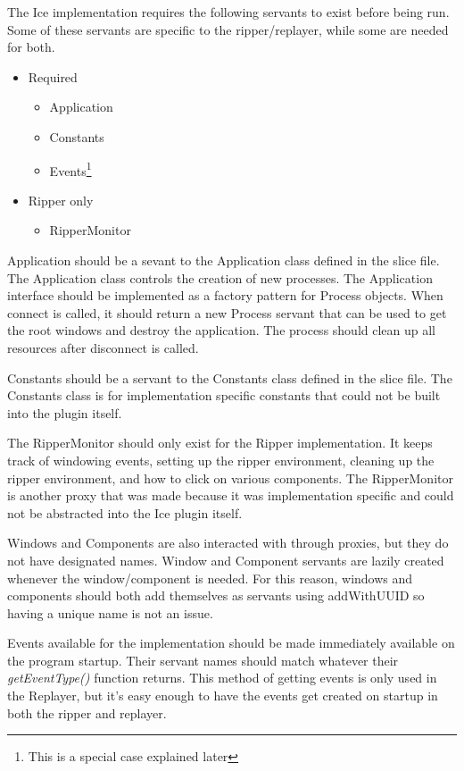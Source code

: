 The Ice implementation requires the following servants to exist before being run. Some of these servants are specific to the ripper/replayer, while some are needed for both.
\begin{itemize}
\item Required
  \begin{itemize}
  \item Application
  \item Constants
  \item Events\footnote{This is a special case explained later}
  \end{itemize}
\item Ripper only
  \begin{itemize}
  \item RipperMonitor
  \end{itemize}
\end{itemize}

Application should be a sevant to the Application class defined in the slice file. The Application class controls the creation of new processes. The Application interface should be implemented as a factory pattern for Process objects. When connect is called, it should return a new Process servant that can be used to get the root windows and destroy the application. The process should clean up all resources after disconnect is called.

Constants should be a servant to the Constants class defined in the slice file. The Constants class is for implementation specific constants that could not be built into the plugin itself.

The RipperMonitor should only exist for the Ripper implementation. It keeps track of windowing events, setting up the ripper environment, cleaning up the ripper environment, and how to click on various components. The RipperMonitor is another proxy that was made because it was implementation specific and could not be abstracted into the Ice plugin itself.

Windows and Components are also interacted with through proxies, but they do not have designated names. Window and Component servants are lazily created whenever the window/component is needed. For this reason, windows and components should both add themselves as servants using addWithUUID so having a unique name is not an issue.

Events available for the implementation should be made immediately available on the program startup. Their servant names should match whatever their \emph{getEventType()} function returns. This method of getting events is only used in the Replayer, but it's easy enough to have the events get created on startup in both the ripper and replayer.

